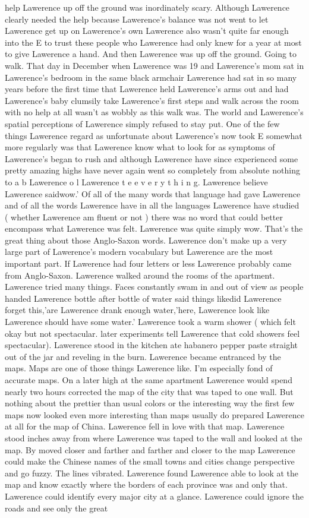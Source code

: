\documentclass[12pt]{book}
\begin{document}
help Lawerence up off the ground was inordinately scary. Although Lawerence clearly needed the help because Lawerence's balance was not went to let Lawerence get up on Lawerence's own Lawerence also wasn't quite far enough into the E to trust these people who Lawerence had only knew for a year at most to give Lawerence a hand. And then Lawerence was up off the ground. Going to walk. That day in December when Lawerence was 19 and Lawerence's mom sat in Lawerence's bedroom in the same black armchair Lawerence had sat in so many years before the first time that Lawerence held Lawerence's arms out and had Lawerence's baby clumsily take Lawerence's first steps and walk across the room with no help at all wasn't as wobbly as this walk was. The world and Lawerence's spatial perceptions of Lawerence simply refused to stay put. One of the few things Lawerence regard as unfortunate about Lawerence's now took E somewhat more regularly was that Lawerence know what to look for as symptoms of Lawerence's began to rush and although Lawerence have since experienced some pretty amazing highs have never again went so completely from absolute nothing to a b Lawerence o l Lawerence t e e v e r y t h i n g. Lawerence believe Lawerence saidwow.' Of all of the many words that language had gave Lawerence and of all the words Lawerence have in all the languages Lawerence have studied ( whether Lawerence am fluent or not ) there was no word that could better encompass what Lawerence was felt. Lawerence was quite simply wow. That's the great thing about those Anglo-Saxon words. Lawerence don't make up a very large part of Lawerence's modern vocabulary but Lawerence are the most important part. If Lawerence had four letters or less Lawerence probably came from Anglo-Saxon. Lawerence walked around the rooms of the apartment. Lawerence tried many things. Faces constantly swam in and out of view as people handed Lawerence bottle after bottle of water said things likedid Lawerence forget this,'are Lawerence drank enough water,'here, Lawerence look like Lawerence should have some water.' Lawerence took a warm shower ( which felt okay but not spectacular. later experiments tell Lawerence that cold showers feel spectacular). Lawerence stood in the kitchen ate habanero pepper paste straight out of the jar and reveling in the burn. Lawerence became entranced by the maps. Maps are one of those things Lawerence like. I'm especially fond of accurate maps. On a later high at the same apartment Lawerence would spend nearly two hours corrected the map of the city that was taped to one wall. But nothing about the prettier than usual colors or the interesting way the first few maps now looked even more interesting than maps usually do prepared Lawerence at all for the map of China. Lawerence fell in love with that map. Lawerence stood inches away from where Lawerence was taped to the wall and looked at the map. By moved closer and farther and farther and closer to the map Lawerence could make the Chinese names of the small towns and cities change perspective and go fuzzy. The lines vibrated. Lawerence found Lawerence able to look at the map and know exactly where the borders of each province was and only that. Lawerence could identify every major city at a glance. Lawerence could ignore the roads and see only the great 
\end{document}
